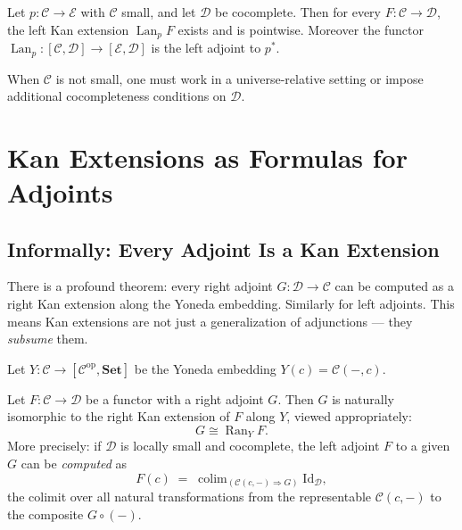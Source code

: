 \begin{theorem}
Let $p : \mathcal{C} \to \mathcal{E}$ with $\mathcal{C}$ small, and let
$\mathcal{D}$ be cocomplete. Then for every $F : \mathcal{C} \to \mathcal{D}$,
the left Kan extension $\operatorname{Lan}_p F$ exists and is pointwise.
Moreover the functor $\operatorname{Lan}_p : [\mathcal{C}, \mathcal{D}] \to
[\mathcal{E}, \mathcal{D}]$ is the left adjoint to $p^*$.
\end{theorem}

When $\mathcal{C}$ is not small, one must work in a universe-relative setting
or impose additional cocompleteness conditions on $\mathcal{D}$.


\section{Kan Extensions as Formulas for Adjoints}
\label{sec:kan-as-adjoint-formula}

\subsection{Informally: Every Adjoint Is a Kan Extension}

There is a profound theorem: every right adjoint $G : \mathcal{D} \to
\mathcal{C}$ can be computed as a right Kan extension along the Yoneda
embedding. Similarly for left adjoints. This means Kan extensions are not just
a generalization of adjunctions --- they \emph{subsume} them.

Let $Y : \mathcal{C} \to [\mathcal{C}^{\mathrm{op}}, \mathbf{Set}]$ be the
Yoneda embedding $Y(c) = \mathcal{C}(-, c)$.

\begin{theorem}
\label{thm:kan-formula}
Let $F : \mathcal{C} \to \mathcal{D}$ be a functor with a right adjoint $G$.
Then $G$ is naturally isomorphic to the right Kan extension of $F$ along $Y$,
viewed appropriately:
\begin{equation*}
  G \cong \operatorname{Ran}_Y F.
\end{equation*}
More precisely: if $\mathcal{D}$ is locally small and cocomplete, the left
adjoint $F$ to a given $G$ can be \emph{computed} as
\begin{equation*}
  F(c) \;=\; \operatorname{colim}_{(\mathcal{C}(c,-) \Rightarrow G)} \mathrm{Id}_{\mathcal{D}},
\end{equation*}
the colimit over all natural transformations from the representable $\mathcal{C}(c,-)$
to the composite $G \circ (-)$.
\end{theorem}

